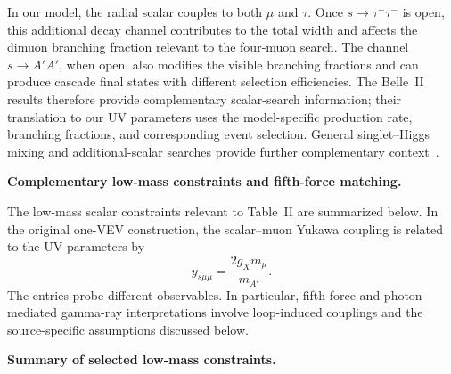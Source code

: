\documentclass[12pt,a4paper]{article}
\begin{document}
In our model, the radial scalar couples to both \(\mu\) and \(\tau\). Once \(s\to\tau^+\tau^-\) is open, this additional decay channel contributes to the total width and affects the dimuon branching fraction relevant to the four-muon search. The channel \(s\to A'A'\), when open, also modifies the visible branching fractions and can produce cascade final states with different selection efficiencies. The Belle~II results therefore provide complementary scalar-search information; their translation to our UV parameters uses the model-specific production rate, branching fractions, and corresponding event selection. General singlet--Higgs mixing and additional-scalar searches provide further complementary context~\cite{Robens:2015singlet,Robens:2020twoSinglets,Boiarska:2019scalarPortal}.

\noindent\textbf{Complementary low-mass constraints and fifth-force matching.}

The low-mass scalar constraints relevant to Table~II are summarized below. In the original one-VEV construction, the scalar--muon Yukawa coupling is related to the UV parameters by
\[
y_{s\mu\mu}=\frac{2g_Xm_\mu}{m_{A'}}.
\]
The entries probe different observables. In particular, fifth-force and photon-mediated gamma-ray interpretations involve loop-induced couplings and the source-specific assumptions discussed below.

\noindent\textbf{Summary of selected low-mass constraints.}
\end{document}
